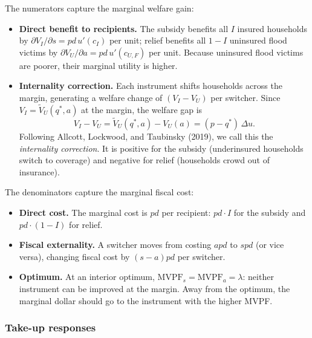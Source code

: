 \documentclass[12pt]{article}
\begin{document}
\noindent The numerators capture the marginal welfare gain:
\begin{itemize}
    \item \textbf{Direct benefit to recipients.} The subsidy benefits all $I$ insured households by $\partial V_I/\partial s = pd\,u'(c_I)$ per unit; relief benefits all $1-I$ uninsured flood victims by $\partial V_U/\partial a = pd\,u'(c_{U,F})$ per unit. Because uninsured flood victims are poorer, their marginal utility is higher.
    \item \textbf{Internality correction.} Each instrument shifts households across the margin, generating a welfare change of $(V_I - V_U)$ per switcher. Since $V_I = \tilde{V}_U(q^*,a)$ at the margin, the welfare gap is
    \begin{equation}
        V_I - V_U = \tilde{V}_U(q^*,a) - V_U(a) = (p-q^*)\,\Delta u. \label{eq:internality}
    \end{equation}
    Following Allcott, Lockwood, and Taubinsky (2019), we call this the \emph{internality correction}. It is positive for the subsidy (underinsured households switch to coverage) and negative for relief (households crowd out of insurance).
\end{itemize}
The denominators capture the marginal fiscal cost:
\begin{itemize}
    \item \textbf{Direct cost.} The marginal cost is $pd$ per recipient: $pd\cdot I$ for the subsidy and $pd\cdot(1-I)$ for relief.
    \item \textbf{Fiscal externality.} A switcher moves from costing $apd$ to $spd$ (or vice versa), changing fiscal cost by $(s-a)pd$ per switcher.
    \item \textbf{Optimum.} At an interior optimum, $\mathrm{MVPF}_s = \mathrm{MVPF}_a = \lambda$: neither instrument can be improved at the margin. Away from the optimum, the marginal dollar should go to the instrument with the higher MVPF.
\end{itemize}

\subsubsection*{Take-up responses} 
\end{document}
